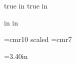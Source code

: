 %
%



\eightpoint

\sloppy

\newif\iflong %
\longfalse
\def\piflong#1{\iflong#1
\else\fi}%
\long\def\lpiflong#1{\iflong#1
\else\fi}%

\def\xpair{{x_1,x_2}}

 true in
 true in
\nopagenumbers

\def\complex{{\bf C}}
\def\real{{\bf R}}
\def\field{{\bf F}}
\def\polynomial{{\cal P}}
\def\dim{{\rm dim}\ }
\def\mnull{{\rm null}\ }
\def\mrange{{\rm range}\ }
\def\mspan{{\rm span}\ }
\def\linear{{\cal L}}
\def\mapmatrix{{\cal M}}

 in
 in
\hsize=10.6in
\vsize=8.05in
\parindent=0pt

\font\bigger =cmr10 scaled
\font\smallfont=cmr7

\def\strutA#1#2{\vrule height#1 depth#2 width0pt}
\def\chapter#1{\vskip 5pt {\bigger #1}}

=3.40in
\newbox\bigbox

\def\dtablestart#1#2{\halign\bgroup \vtop{\parindent=0pt\hsize=#1\strut##\strut}\hfil&\hskip 0.10 in\vtop{\parindent=0pt\hsize=#2\strut##\strut}\cr}
\def\dtableend{\egroup}


